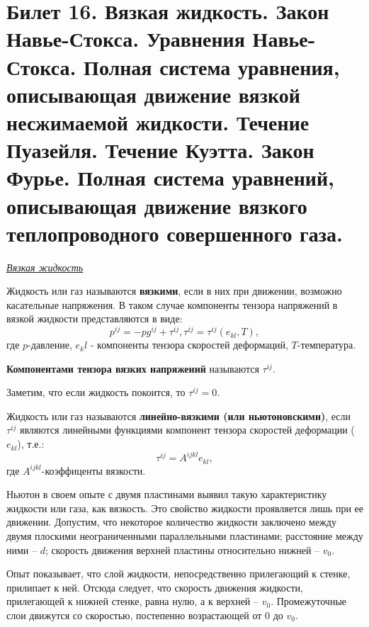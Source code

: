 \newpage
\section{Билет 16. Вязкая жидкость. Закон Навье-Стокса. Уравнения Навье-Стокса. Полная система уравнения, описывающая движение вязкой несжимаемой жидкости. Течение Пуазейля. Течение Куэтта. Закон Фурье. Полная система уравнений, описывающая движение вязкого теплопроводного совершенного газа.}

\begin{center}
  \textit{\underline{Вязкая жидкость}}
\end{center}

\begin{defn}
  Жидкость или газ называются \textbf{вязкими}, если в них при движении, возможно касательные напряжения. В таком случае компоненты тензора напряжений в вязкой жидкости представляются в виде: $$p^{ij}=-pg^{ij} + \tau^{ij},  \tau^{ij} = \tau^{ij}(e_{kl}, T) ,$$
  где $p$-давление, $e_kl$ - компоненты тензора скоростей деформаций, $T$-температура.
\end{defn}

\begin{defn}
  \textbf{Компонентами тензора вязких напряжений} называются $\tau^{ij}$.
\end{defn}

Заметим, что если жидкость покоится, то $\tau^{ij} = 0$.

\begin{defn}
  Жидкость или газ называются \textbf{линейно-вязкими (или ньютоновскими)}, если $\tau^{ij}$ являются линейными функциями компонент тензора скоростей деформации ($e_{kl}$), т.е.: $$\tau^{ij} = A^{ijkl}e_{kl}, $$ где $A^{ijkl}$-коэффиценты вязкости.
\end{defn}


Ньютон в своем опыте с двумя пластинами выявил такую характеристику жидкости или газа, как вязкость.  Это свойство жидкости проявляется лишь при ее движении. Допустим, что некоторое количество жидкости заключено между двумя плоскими неограниченными параллельными пластинами; расстояние между ними – $d$; скорость движения верхней пластины относительно нижней – $v_0$.

Опыт показывает, что слой жидкости, непосредственно прилегающий к стенке, прилипает к ней. Отсюда следует, что скорость движения жидкости, прилегающей к нижней стенке, равна нулю, а к верхней – $v_0$. Промежуточные слои движутся со скоростью, постепенно возрастающей от $0$ до $v_0$.

